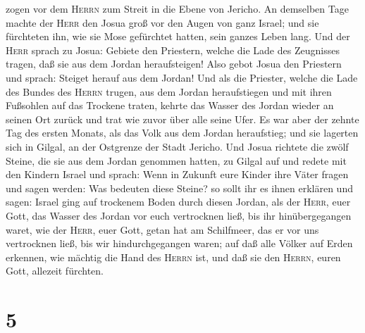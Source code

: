 zogen vor dem \textsc{Herrn} zum Streit in die Ebene von Jericho.
 An demselben Tage machte der \textsc{Herr} den Josua
groß vor den Augen von ganz Israel; und sie fürchteten ihn, wie sie Mose
gefürchtet hatten, sein ganzes Leben lang.  Und der
\textsc{Herr} sprach zu Josua:  Gebiete den Priestern,
welche die Lade des Zeugnisses tragen, daß sie aus dem Jordan
heraufsteigen!  Also gebot Josua den Priestern und
sprach: Steiget herauf aus dem Jordan!  Und als die
Priester, welche die Lade des Bundes des \textsc{Herrn} trugen, aus dem
Jordan heraufstiegen und mit ihren Fußsohlen auf das Trockene traten,
kehrte das Wasser des Jordan wieder an seinen Ort zurück und trat wie
zuvor über alle seine Ufer.  Es war aber der zehnte Tag
des ersten Monats, als das Volk aus dem Jordan heraufstieg; und sie
lagerten sich in Gilgal, an der Ostgrenze der Stadt Jericho.
 Und Josua richtete die zwölf Steine, die sie aus dem
Jordan genommen hatten, zu Gilgal auf  und redete mit den
Kindern Israel und sprach: Wenn in Zukunft eure Kinder ihre Väter fragen
und sagen werden:  Was bedeuten diese Steine? so sollt
ihr es ihnen erklären und sagen: Israel ging auf trockenem Boden durch
diesen Jordan,  als der \textsc{Herr}, euer Gott, das
Wasser des Jordan vor euch vertrocknen ließ, bis ihr hinübergegangen
waret, wie der \textsc{Herr}, euer Gott, getan hat am Schilfmeer, das er
vor uns vertrocknen ließ, bis wir hindurchgegangen waren;
 auf daß alle Völker auf Erden erkennen, wie mächtig die
Hand des \textsc{Herrn} ist, und daß sie den \textsc{Herrn}, euren Gott,
allezeit fürchten.

\hypertarget{section-4}{%
\section{5}\label{section-4}}

